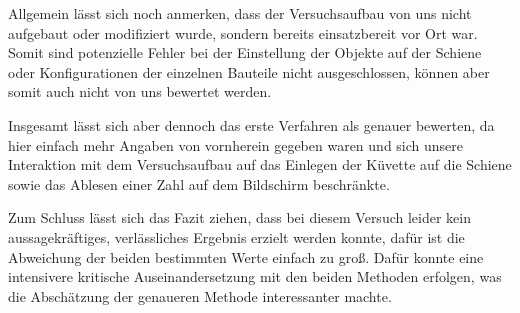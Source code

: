 \documentclass{article}
\begin{document}
Allgemein lässt sich noch anmerken, dass der Versuchsaufbau von uns nicht aufgebaut oder modifiziert wurde, sondern bereits einsatzbereit vor Ort war. Somit sind potenzielle Fehler bei der Einstellung der Objekte auf der Schiene oder Konfigurationen der einzelnen Bauteile nicht ausgeschlossen, können aber somit auch nicht von uns bewertet werden.  

Insgesamt lässt sich aber dennoch das erste Verfahren als genauer bewerten, da hier einfach mehr Angaben von vornherein gegeben waren und sich unsere Interaktion mit dem Versuchsaufbau auf das Einlegen der Küvette auf die Schiene sowie das Ablesen einer Zahl auf dem Bildschirm beschränkte. 

Zum Schluss lässt sich das Fazit ziehen, dass bei diesem Versuch leider kein aussagekräftiges, verlässliches Ergebnis erzielt werden konnte, dafür ist die Abweichung der beiden bestimmten Werte einfach zu groß. Dafür konnte eine intensivere kritische Auseinandersetzung mit den beiden Methoden erfolgen, was die Abschätzung der genaueren Methode interessanter machte. 
\end{document}
